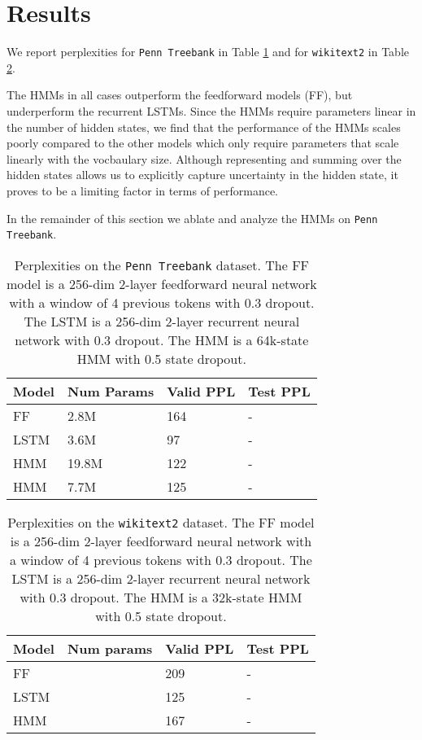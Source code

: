 \documentclass[11pt,a4paper]{article}
\begin{document}
\section{Results}
We report perplexities 
for \texttt{Penn Treebank} in Table \ref{tbl:ppl-ptb} and for 
\texttt{wikitext2} in Table \ref{tbl:ppl-wikitext2}.

The HMMs in all cases outperform the feedforward models (FF),
but underperform the recurrent LSTMs.
Since the HMMs require parameters linear in the number of hidden states,
we find that the performance of the HMMs scales poorly compared to the other models
which only require parameters that scale linearly with the vocbaulary size.
Although representing and summing over the hidden states
allows us to explicitly capture uncertainty in the hidden state,
it proves to be a limiting factor in terms of performance.

In the remainder of this section we ablate and analyze the HMMs on \texttt{Penn Treebank}.


\begin{table}[!t]
\centering
\caption{\label{tbl:ppl-ptb}
Perplexities on the \texttt{Penn Treebank} dataset.
The FF model is a 256-dim 2-layer feedforward neural network
with a window of 4 previous tokens with 0.3 dropout.
The LSTM is a 256-dim 2-layer recurrent neural network with 0.3 dropout.
The HMM is a 64k-state HMM with 0.5 state dropout.
}
\begin{tabular}{llll}
\toprule
Model & Num Params & Valid PPL & Test PPL\\
\midrule
FF    & 2.8M       & 164         & -       \\
LSTM  & 3.6M       & 97          & -       \\
HMM   & 19.8M      & 122         & -       \\
HMM   & 7.7M       & 125         & -       \\
\bottomrule
\end{tabular}
\end{table}

\begin{table}[!t]
\centering
\caption{\label{tbl:ppl-wikitext2}
Perplexities on the \texttt{wikitext2} dataset.
The FF model is a 256-dim 2-layer feedforward neural network
with a window of 4 previous tokens with 0.3 dropout.
The LSTM is a 256-dim 2-layer recurrent neural network with 0.3 dropout.
The HMM is a 32k-state HMM with 0.5 state dropout.
}
\begin{tabular}{llll}
\toprule
Model & Num params & Valid PPL & Test PPL\\
\midrule
FF    &            & 209       & -       \\
LSTM  &            & 125       & -       \\
HMM   &            & 167       & -       \\
\bottomrule
\end{tabular}
\end{table}
\end{document}
